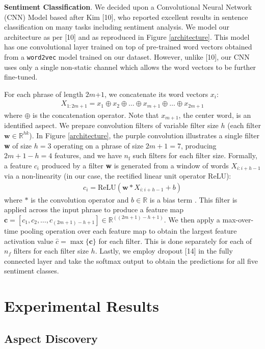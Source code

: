 \documentclass{article} %
\begin{document}
\textbf{Sentiment Classification}. We decided upon a Convolutional Neural Network (CNN) Model based after Kim [10], who reported excellent results in sentence classification on many tasks including sentiment analysis. We model our architecture as per [10] and as reproduced in Figure \ref{architecture}. This model has one convolutional layer trained on top of pre-trained word vectors obtained from a \texttt{word2vec} model trained on our dataset. However, unlike [10], our CNN uses only a single non-static channel which allows the word vectors to be further fine-tuned.

For each phrase of length $2m$+$1$, we concatenate its word vectors $x_i$: %
\begin{align}
	X_{1:2m+1} = x_1 \oplus x_2 \oplus \ldots \oplus x_{m+1} \oplus \ldots \oplus x_{2m+1}
\end{align}
where $\oplus$ is the concatenation operator. Note that $x_{m+1}$, the center word, is an identified aspect. We prepare convolution filters of variable filter size $h$ (each filter $\textbf{w} \in \mathbb{R}^{hk}$). In Figure \ref{architecture}, the purple convolution illustrates a single filter \textbf{w} of size $h=3$ operating on a phrase of size $2m+1 = 7$, producing $2m+1 - h = 4$ features, and we have $n_\text{f}$ such filters for each filter size. Formally, a feature $c_i$ produced by a filter \textbf{w} is generated from a window of words $X_{i:i+h-1}$ via a non-linearity (in our case, the rectified linear unit operator ReLU):
\begin{align}
c_i = \text{ReLU}(\textbf{w} * X_{i:i+h-1} + b)
\end{align}
where $*$ is the convolution operator and $b \in \mathbb{R}$ is a bias term . This filter is applied across the input phrase to produce a feature map $\textbf{c} = [c_1, c_2, \ldots, c_{(2m+1)-h+1}] \in \mathbb{R}^{((2m+1)-h+1)}$. We then apply a max-over-time pooling operation over each feature map to obtain the largest feature activation value $\hat{c} = \max \{\textbf{c}\}$ for each filter. This is done separately for each of $n_f$ filters for each filter size $h$. Lastly, we employ dropout [14] in the fully connected layer and take the softmax output to obtain the predictions for all five sentiment classes.


\section{Experimental Results} 

\subsection{Aspect Discovery} 
\end{document}

